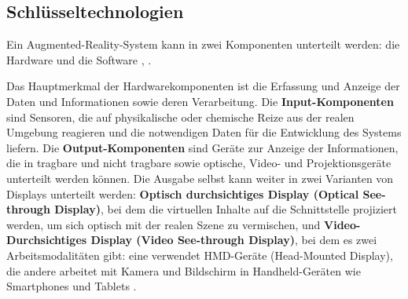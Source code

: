 \subsection {Schlüsseltechnologien}

Ein Augmented-Reality-System kann in zwei Komponenten unterteilt werden: die Hardware und die Software \cite{craig2013understanding}, \cite{Chatzopoulos}.

Das Hauptmerkmal der Hardwarekomponenten ist die Erfassung und Anzeige der Daten und Informationen sowie deren Verarbeitung. Die \textbf{Input-Komponenten} sind Sensoren, die auf physikalische oder chemische Reize aus der realen Umgebung reagieren und die notwendigen Daten für die Entwicklung des Systems liefern. Die \textbf{Output-Komponenten} sind Geräte zur Anzeige der Informationen, die in tragbare und nicht tragbare sowie optische, Video- und Projektionsgeräte unterteilt werden können. Die Ausgabe selbst kann weiter in zwei Varianten von Displays unterteilt werden: \textbf{Optisch durchsichtiges Display (Optical See-through Display)}, bei dem die virtuellen Inhalte auf die Schnittstelle projiziert werden, um sich optisch mit der realen Szene zu vermischen, und \textbf{Video-Durchsichtiges Display (Video See-through Display)}, bei dem es zwei Arbeitsmodalitäten gibt: eine verwendet HMD-Geräte (Head-Mounted Display), die andere arbeitet mit Kamera und Bildschirm in Handheld-Geräten wie Smartphones und Tablets \cite{Azuma1997ASO}.

